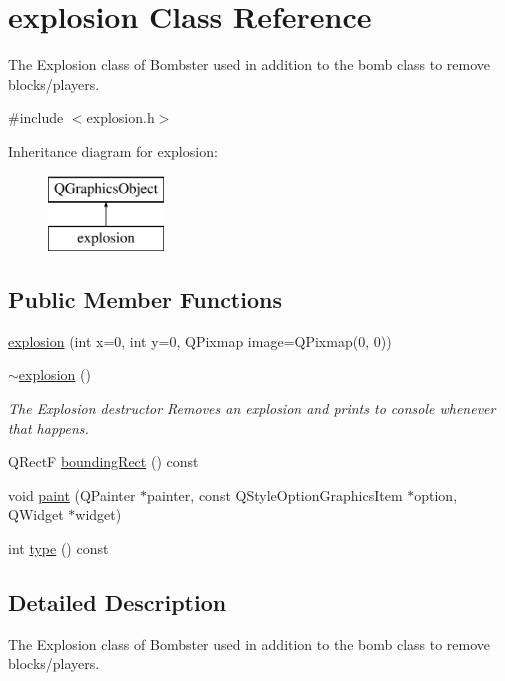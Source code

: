 \hypertarget{classexplosion}{\section{explosion Class Reference}
\label{classexplosion}
}


The Explosion class of Bombster used in addition to the bomb class to remove blocks/players.  




{\ttfamily \#include $<$explosion.\-h$>$}

Inheritance diagram for explosion\-:\begin{figure}[H]
\begin{center}
\leavevmode
\includegraphics[height=2.000000cm]{classexplosion}
\end{center}
\end{figure}
\subsection*{Public Member Functions}
\begin{DoxyCompactItemize}
\item 
\hyperlink{classexplosion_a792865d6d3230927b5a85c72c9867555}{explosion} (int x=0, int y=0, Q\-Pixmap image=Q\-Pixmap(0, 0))
\item 
\hyperlink{classexplosion_a3fc08d8c702d74ee3164825c975f8230}{$\sim$explosion} ()
\begin{DoxyCompactList}\small\item\em The Explosion destructor Removes an explosion and prints to console whenever that happens. \end{DoxyCompactList}\item 
Q\-Rect\-F \hyperlink{classexplosion_adc8680178e9e7d4e388d8850a2c03125}{bounding\-Rect} () const 
\item 
void \hyperlink{classexplosion_a401d7dbebfc4a92bcc408172df67c782}{paint} (Q\-Painter $\ast$painter, const Q\-Style\-Option\-Graphics\-Item $\ast$option, Q\-Widget $\ast$widget)
\item 
int \hyperlink{classexplosion_a1f660a5ee0c892cdd4edba1d00df87a7}{type} () const 
\end{DoxyCompactItemize}


\subsection{Detailed Description}
The Explosion class of Bombster used in addition to the bomb class to remove blocks/players. 

